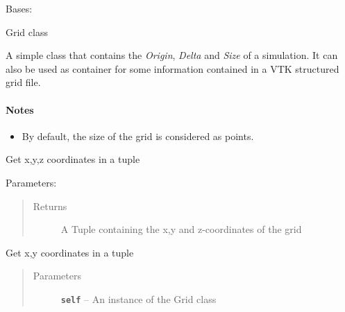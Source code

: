 \documentclass[letterpaper,10pt,english]{sphinxmanual}
\begin{document}
\begin{fulllineitems}
\label{hyvr:hyvr.hyvr.grid.Grid}
Bases: 

Grid class

A simple class that contains the \emph{Origin}, \emph{Delta} and \emph{Size} of a
simulation. It can also be used as container for some information
contained in a VTK structured grid file.
\paragraph{Notes}
\begin{itemize}
\item {} 
By default, the size of the grid is considered as points.

\end{itemize}







\begin{fulllineitems}
\label{hyvr:hyvr.hyvr.grid.Grid.cart_coords}
Get x,y,z coordinates in a tuple

Parameters:
\begin{quote}\begin{description}
\item[{Returns}] \leavevmode
A Tuple containing the x,y and z-coordinates of the grid

\end{description}\end{quote}

\end{fulllineitems}


\begin{fulllineitems}
\label{hyvr:hyvr.hyvr.grid.Grid.cart_coords2d}
Get x,y coordinates in a tuple
\begin{quote}\begin{description}
\item[{Parameters}] \leavevmode
\textbf{\texttt{self}} -- An instance of the Grid class


\end{description}
\end{quote}
\end{fulllineitems}
\end{fulllineitems}
\end{document}
